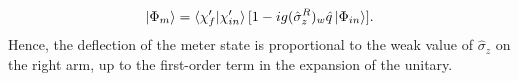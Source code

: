\documentclass[aps,pra,showpacs,twoside,twocolumn,10pt]{revtex4-1}
\begin{document}
\begin{equation}
\ket{\Phi_m}=\braket{\chi_f^{\prime}|\chi_{in}^{\prime}}[1-ig(\hat{\sigma}_z^R)_w \hat{q}\ket{\Phi_{in}}].
\end{equation}
Hence, the deflection of the meter state is proportional to the weak value of $\hat{\sigma}_z$ on the right arm, up to the first-order term in the expansion of the unitary.
\end{document}

